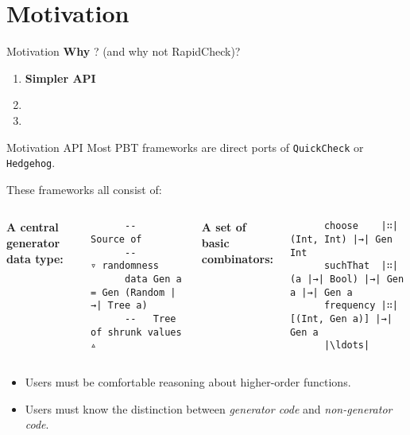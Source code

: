 \section{Motivation}

\begin{frame}{\halcheck{} \textemdash{} Motivation}
  \textbf{Why} \halcheck{}? (and why not RapidCheck)?

  \begin{enumerate}
    \item \textbf{Simpler API}
    \item
    \item
  \end{enumerate}
\end{frame}

\begin{frame}[fragile]{\halcheck{} \textemdash{} Motivation \textemdash{} API}
  Most PBT frameworks are direct ports of \texttt{QuickCheck} or \texttt{Hedgehog}.

  These frameworks all consist of:

  \pause{}

  \bigskip{}

  \begin{columns}
    \textbf{A central generator data type:}
    \begin{verbatim}
      --                  Source of
      --                ▿ randomness
      data Gen a = Gen (Random |→| Tree a)
      --   Tree of shrunk values ▵
    \end{verbatim}

    \pause{}

    \textbf{A set of basic combinators:}
    \begin{verbatim}
      choose    |∷| (Int, Int) |→| Gen Int
      suchThat  |∷| (a |→| Bool) |→| Gen a |→| Gen a
      frequency |∷| [(Int, Gen a)] |→| Gen a
      |\ldots|
    \end{verbatim}
  \end{columns}

  \pause{}

  \bigskip{}

  \begin{itemize}
    \item Users must be comfortable reasoning about higher-order functions.
    \item Users must know the distinction between \emph{generator code} and \emph{non-generator code}.
  \end{itemize}
\end{frame}

